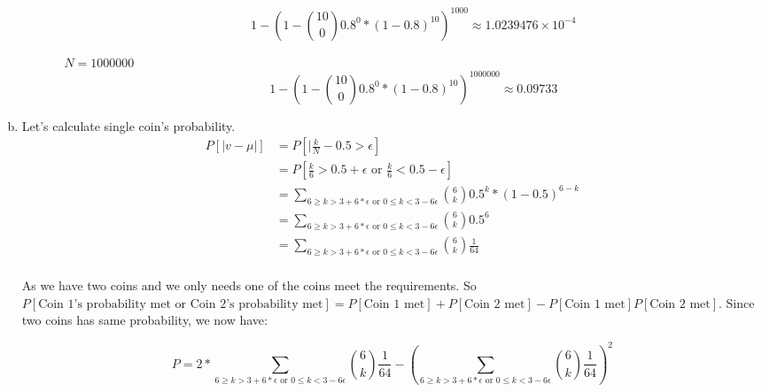 \documentclass{article}
\def\math#1{$#1$}
\begin{document}
\begin{enumerate}[a)]
\begin{itemize}
\begin{itemize}
                     \begin{equation}
                        1 - (1 - {10 \choose 0} 0.8^0 * (1 - 0.8)^{10})^{1000} \approx 1.0239476 \times 10^{-4}
                    \end{equation}
                \item [\math{N = 1000000}]
                     \begin{equation}
                        1 - (1 - {10 \choose 0} 0.8^0 * (1 - 0.8)^{10})^{1000000} \approx 0.09733
                    \end{equation}
                \end{itemize}
        \end{itemize}
    \item Let's calculate single coin's probability. 
        \begin{equation}
            \begin{split}
                P[\lvert v - \mu \rvert] &= P[\lvert \frac{k}{N} - 0.5 > \epsilon] \\
                &= P[\frac{k}{6} > 0.5 + \epsilon \text{ or } \frac{k}{6} < 0.5 - \epsilon] \\
                &= \sum_{6 \geq k > 3 + 6 * \epsilon \text{ or } 0 \leq k < 3 - 6 \epsilon} {6 \choose k} 0.5^k * (1 - 0.5)^{6 - k} \\
                &= \sum_{6 \geq k > 3 + 6 * \epsilon \text{ or } 0 \leq k < 3 - 6 \epsilon} {6 \choose k} 0.5^6 \\
                &= \sum_{6 \geq k > 3 + 6 * \epsilon \text{ or } 0 \leq k < 3 - 6 \epsilon} {6 \choose k} \frac{1}{64} \\
            \end{split}
        \end{equation}
        
        As we have two coins and we only needs one of the coins meet the requirements. So \math{P[\text{Coin 1's probability met or Coin 2's probability met}] = P[\text{Coin 1 met}] + P[\text{Coin 2 met}] - P[\text{Coin 1 met}]P[\text{Coin 2 met}]}. Since two coins has same probability, we now have:
        
        \begin{equation}
                P = 2 * \sum_{6 \geq k > 3 + 6 * \epsilon \text{ or } 0 \leq k < 3 - 6 \epsilon} {6 \choose k} \frac{1}{64} - (\sum_{6 \geq k > 3 + 6 * \epsilon \text{ or } 0 \leq k < 3 - 6 \epsilon} {6 \choose k} \frac{1}{64})^2
        \end{equation}
        

\end{enumerate}
\end{document}
